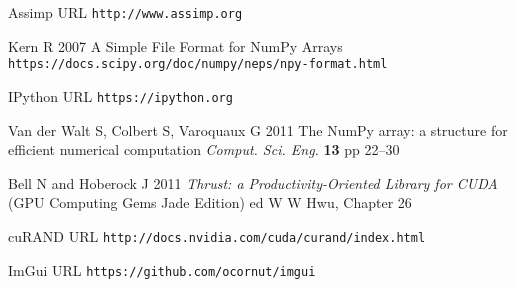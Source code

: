 \documentclass[a4paper]{jpconf}
\begin{document}
\begin{thebibliography}{9}
Assimp URL {\tt http://www.assimp.org}


Kern R
2007
A Simple File Format for NumPy Arrays
{\tt https://docs.scipy.org/doc/numpy/neps/npy-format.html}

IPython URL {\tt https://ipython.org}

Van der Walt S, Colbert S, Varoquaux G 
2011 
The NumPy array: a structure for efficient numerical computation
{\it Comput. Sci. Eng.} {\bf 13} pp 22--30

%

Bell N and Hoberock J 
2011
{\it Thrust: a Productivity-Oriented Library for CUDA}
(GPU Computing Gems Jade Edition) ed W W Hwu, Chapter 26


cuRAND URL {\tt http://docs.nvidia.com/cuda/curand/index.html}


%
%

ImGui URL {\tt https://github.com/ocornut/imgui}


%
%

\end{thebibliography}
\end{document}
